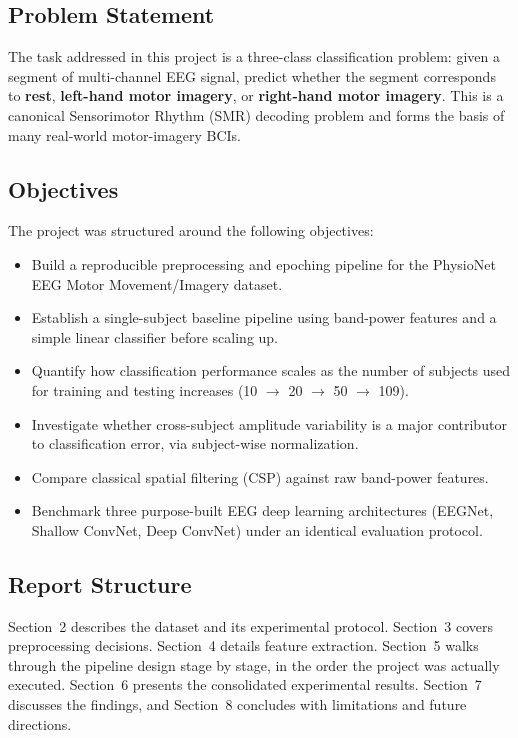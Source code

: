 \documentclass[11pt,a4paper]{article}
\begin{document}
\subsection{Problem Statement}
The task addressed in this project is a three-class classification problem: given a segment of multi-channel EEG signal, predict whether the segment corresponds to \textbf{rest}, \textbf{left-hand motor imagery}, or \textbf{right-hand motor imagery}. This is a canonical Sensorimotor Rhythm (SMR) decoding problem and forms the basis of many real-world motor-imagery BCIs.

\subsection{Objectives}
The project was structured around the following objectives:
\begin{itemize}[leftmargin=1.5em]
    \item Build a reproducible preprocessing and epoching pipeline for the PhysioNet EEG Motor Movement/Imagery dataset.
    \item Establish a single-subject baseline pipeline using band-power features and a simple linear classifier before scaling up.
    \item Quantify how classification performance scales as the number of subjects used for training and testing increases (10 $\rightarrow$ 20 $\rightarrow$ 50 $\rightarrow$ 109).
    \item Investigate whether cross-subject amplitude variability is a major contributor to classification error, via subject-wise normalization.
    \item Compare classical spatial filtering (CSP) against raw band-power features.
    \item Benchmark three purpose-built EEG deep learning architectures (EEGNet, Shallow ConvNet, Deep ConvNet) under an identical evaluation protocol.
\end{itemize}

\subsection{Report Structure}
Section~2 describes the dataset and its experimental protocol. Section~3 covers preprocessing decisions. Section~4 details feature extraction. Section~5 walks through the pipeline design stage by stage, in the order the project was actually executed. Section~6 presents the consolidated experimental results. Section~7 discusses the findings, and Section~8 concludes with limitations and future directions.
\end{document}

